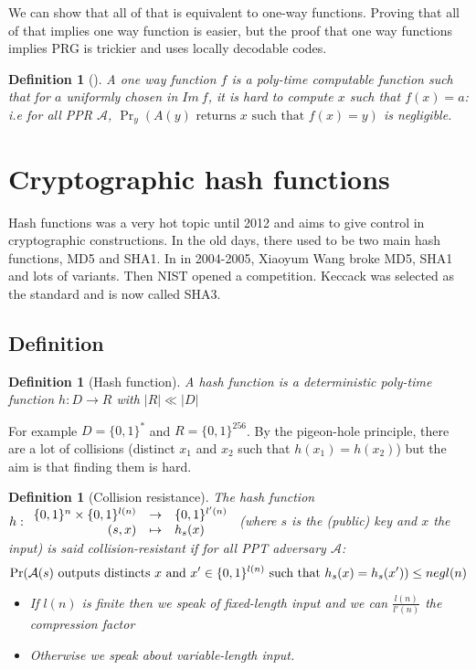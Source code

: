 \documentclass{article}
\newtheorem{defi}[thm]{Definition}
\newcommand{\Def}[3]{\begin{defi}[#1]\label{#2}#3\end{defi}}
\newcommand{\A}{\mathcal{A}}
\newcommand{\bit}{\{0,1\}}
\begin{document}
We can show that all of that is equivalent to one-way functions. Proving that all of that implies one way function is easier, but the proof that one way functions implies PRG is trickier and uses locally decodable codes.

\Def{}{def:oneway}{A one way function $f$ is a poly-time computable function such that for $a$ uniformly chosen in $Im\ f$, it is hard to compute $x$ such that $f(x)=a$: i.e for all PPR $\A$, $\Pr_y(A(y)\text{ returns $x$ such that } f(x)=y)$ is negligible.}

\section{Cryptographic hash functions}
Hash functions was a very hot topic until 2012 and aims to give control in cryptographic constructions. In the old days, there used to be two main hash functions, MD5 and SHA1. In in 2004-2005, Xiaoyum Wang broke MD5, SHA1 and lots of variants. Then NIST opened a competition. Keccack was selected as the standard and is now called SHA3.

\subsection{Definition}
\Def{Hash function}{def:hash}{A hash function is a deterministic poly-time function $h:D\rightarrow R$ with $|R|\ll|D|$}

For example $D=\bit^*$ and $R=\bit^{256}$. By the pigeon-hole principle, there are a lot of collisions (distinct $x_1$ and $x_2$ such that $h(x_1)=h(x_2)$) but the aim is that finding them is hard.

\Def{Collision resistance}{def:collisionResist}{The hash function $h:\begin{array}{r c l}
\bit^n\times\bit^{l(n)}&\rightarrow&\bit^{l'(n)}\\
(s,x) & \mapsto & h_s(x)
\end{array}$ (where $s$ is the (public) key and $x$ the input) is said collision-resistant if for all PPT adversary $\A$:
 \[\Pr(\A(s)\text{ outputs distincts $x$ and $x'\in\bit^{l(n)}$ such that $ h_s(x)=h_s(x')$})\leq negl(n) \]
 
 \begin{itemize}
 \item If $l(n)$ is finite then we speak of fixed-length input and we can $\frac{l(n)}{l'(n)}$ the compression factor
 \item Otherwise we speak about variable-length input.
 \end{itemize}}
 
\end{document}
